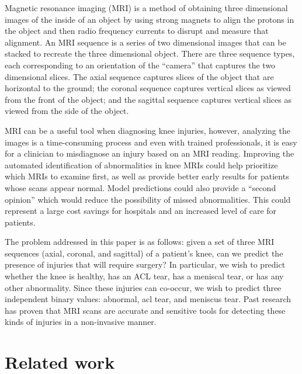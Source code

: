 \documentclass[10pt,twocolumn,letterpaper]{article}
\begin{document}
Magnetic resonance imaging (MRI) is a method of obtaining three dimensional images of the inside of an object by using strong magnets to align the protons in the object and then radio frequency currents to disrupt and measure that alignment. An MRI sequence is a series of two dimensional images that can be stacked to recreate the three dimensional object. There are three sequence types, each corresponding to an orientation of the ``camera'' that captures the two dimensional slices. The axial sequence captures slices of the object that are horizontal to the ground; the coronal sequence captures vertical slices as viewed from the front of the object; and the sagittal sequence captures vertical slices as viewed from the side of the object.

MRI can be a useful tool when diagnosing knee injuries\cite{orlando2015diagnosis,figueiredo2018use,smith2012diagnostic}, however, analyzing the images is a time-consuming process and even with trained professionals, it is easy for a clinician to misdiagnose an injury based on an MRI reading\cite{kolata2011}. Improving the automated identification of abnormalities in knee MRIs could help prioritize which MRIs to examine first, as well as provide better early results for patients whose scans appear normal. Model predictions could also provide a ``second opinion'' which would reduce the possibility of missed abnormalities. This could represent a large cost savings for hospitals and an increased level of care for patients.

The problem addressed in this paper is as follows: given a set of three MRI sequences (axial, coronal, and sagittal) of a patient's knee, can we predict the presence of injuries that will require surgery? In particular, we wish to predict whether the knee is healthy, has an ACL tear, has a meniscal tear, or has any other abnormality. Since these injuries can co-occur, we wish to predict three independent binary values: abnormal, acl tear, and meniscus tear. Past research has proven that MRI scans are accurate and sensitive tools for detecting these kinds of injuries in a non-invasive manner\cite{boeve1991magnetic,felli2016comparison,yaqoob2015diagnostic}.


\section{Related work}
\label{related-work} %
\end{document}
